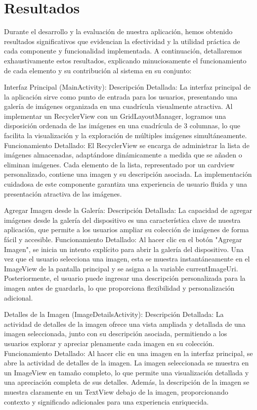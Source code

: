 \documentclass[conference]{IEEEtran}
\begin{document}
\section{Resultados}

Durante el desarrollo y la evaluación de nuestra aplicación, hemos obtenido resultados significativos que evidencian la efectividad y la utilidad práctica de cada componente y funcionalidad implementada. A continuación, detallaremos exhaustivamente estos resultados, explicando minuciosamente el funcionamiento de cada elemento y su contribución al sistema en su conjunto:

Interfaz Principal (MainActivity):
Descripción Detallada: La interfaz principal de la aplicación sirve como punto de entrada para los usuarios, presentando una galería de imágenes organizada en una cuadrícula visualmente atractiva. Al implementar un RecyclerView con un GridLayoutManager, logramos una disposición ordenada de las imágenes en una cuadrícula de 3 columnas, lo que facilita la visualización y la exploración de múltiples imágenes simultáneamente.
Funcionamiento Detallado: El RecyclerView se encarga de administrar la lista de imágenes almacenadas, adaptándose dinámicamente a medida que se añaden o eliminan imágenes. Cada elemento de la lista, representado por un cardview personalizado, contiene una imagen y su descripción asociada. La implementación cuidadosa de este componente garantiza una experiencia de usuario fluida y una presentación atractiva de las imágenes.

Agregar Imagen desde la Galería:
Descripción Detallada: La capacidad de agregar imágenes desde la galería del dispositivo es una característica clave de nuestra aplicación, que permite a los usuarios ampliar su colección de imágenes de forma fácil y accesible.
Funcionamiento Detallado: Al hacer clic en el botón "Agregar Imagen", se inicia un intento explícito para abrir la galería del dispositivo. Una vez que el usuario selecciona una imagen, esta se muestra instantáneamente en el ImageView de la pantalla principal y se asigna a la variable currentImageUri. Posteriormente, el usuario puede ingresar una descripción personalizada para la imagen antes de guardarla, lo que proporciona flexibilidad y personalización adicional.

Detalles de la Imagen (ImageDetailsActivity):
Descripción Detallada: La actividad de detalles de la imagen ofrece una vista ampliada y detallada de una imagen seleccionada, junto con su descripción asociada, permitiendo a los usuarios explorar y apreciar plenamente cada imagen en su colección.
Funcionamiento Detallado: Al hacer clic en una imagen en la interfaz principal, se abre la actividad de detalles de la imagen. La imagen seleccionada se muestra en un ImageView en tamaño completo, lo que permite una visualización detallada y una apreciación completa de sus detalles. Además, la descripción de la imagen se muestra claramente en un TextView debajo de la imagen, proporcionando contexto y significado adicionales para una experiencia enriquecida.
\end{document}
